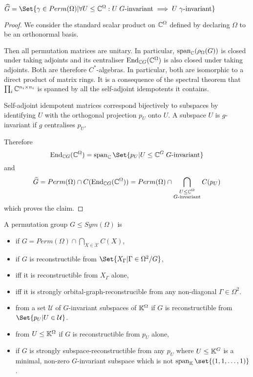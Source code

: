 \documentclass[fontsize=11pt,fleqn,a4paper]{scrartcl}
\begin{document}
\begin{theorem}\label{two_closure:in_terms_of_subspaces}
$\widehat{G} = \Set{\gamma\in Perm(\Omega) | \forall U\leq\IC^\Omega: U\;G\text{-invariant} \implies U\;\gamma\text{-invariant}}$
\end{theorem}
\begin{proof}
We consider the standard scalar product on $\mathbb{C}^\Omega$ defined by declaring $\Omega$ to be an orthonormal basis.

Then all permutation matrices are unitary. In particular, $\operatorname{span}_{\mathbb{C}}(\rho_\Omega(G))$ is closed under taking adjoints and its centraliser $\operatorname{End}_{\mathbb{C} G}(\mathbb{C}^\Omega)$ is also closed under taking adjoints. Both are therefore $C^\ast$-algebras. In particular, both are isomorphic to a direct product of matrix rings. It is a consequence of the spectral theorem that $\prod_i \mathbb{C}^{n_i\times n_i}$ is spanned by all the self-adjoint idempotents it contains.

\medbreak
Self-adjoint idempotent matrices correspond bijectively to subspaces by identifying $U$ with the orthogonal projection $p_U$ onto $U$. A subspace $U$ is $g$-invariant if $g$ centralises $p_U$.

Therefore
\[\End_{\IC G}(\IC^\Omega) = \LinHull_\IC\Set{p_U | U\leq\IC^G\;G\text{-invariant}}\]
and
\[\widehat{G} = Perm(\Omega) \cap C(\operatorname{End}_{\mathbb{C} G}(\mathbb{C}^\Omega)) = Perm(\Omega) \cap \bigcap_{\substack{U\leq\mathbb{C}^\Omega \\ G\text{-invariant}}} C(p_U)\]
which proves the claim.
\end{proof}

\begin{definition}
A permutation group $G\leq Sym(\Omega)$ is
\begin{itemize}
\item {} if $G = Perm(\Omega) \cap \bigcap_{X\in\mathcal{X}} C(X)$,
\item {} if $G$ is reconstructible from $\Set{X_\Gamma | \Gamma\in\Omega^2/G}$,
\item {} iff it is reconstructible from $X_\Gamma$ alone,
\item {} iff it is strongly orbital-graph-reconstrucible from any non-diagonal $\Gamma\in\Omega^2$.
\item {} from a set $\mathcal{U}$ of $G$-invariant subspaces of $\mathbb{K}^\Omega$ if $G$ is reconstructible from $\Set{p_U | U\in\mathcal{U}}$.
\item {} from $U\leq\mathbb{K}^\Omega$ if $G$ is reconstructible from $p_U$ alone,
\item {} if $G$ is strongly subspace-reconstructible from any $p_U$ where $U\leq\mathbb{K}^G$ is a minimal, non-zero $G$-invariant subspace which is not $\LinHull_\IK\set{(1,1,\ldots,1)}$.
\end{itemize}
\end{definition}
\end{document}
